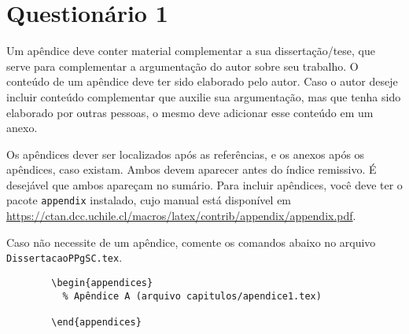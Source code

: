 \chapter{Questionário 1}

Um apêndice deve conter material complementar a sua dissertação/tese, que serve para complementar a argumentação do autor sobre seu trabalho. O conteúdo de um apêndice deve ter sido elaborado pelo autor. Caso o autor deseje incluir conteúdo complementar que auxilie sua argumentação, mas que tenha sido elaborado por outras pessoas, o mesmo deve adicionar esse conteúdo em um anexo.

Os apêndices dever ser localizados após as referências, e os anexos após os apêndices, caso existam. Ambos devem aparecer antes do índice remissivo. É desejável que ambos apareçam no sumário. Para incluir apêndices, você deve ter o pacote \texttt{appendix} \parencite{appendix} instalado, cujo manual está disponível em \url{https://ctan.dcc.uchile.cl/macros/latex/contrib/appendix/appendix.pdf}.

Caso não necessite de um apêndice, comente os comandos abaixo no arquivo \texttt{DissertacaoPPgSC.tex}.

\begin{listing}[ht]
	\begin{verbatim}
		\begin{appendices}
		  % Apêndice A (arquivo capitulos/apendice1.tex)
		  
		\end{appendices}
	\end{verbatim}
	\caption{Exemplo de código \LaTeX{} usado para carregar um arquivo de apêndice.}
	\label{cod:appendix}
\end{listing}